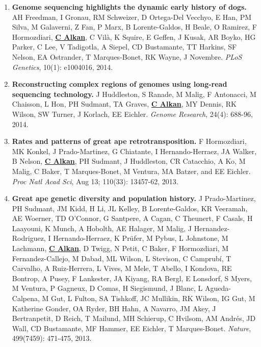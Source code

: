 \begin{enumerate}
  
  \item        
         {\bf Genome sequencing highlights the dynamic early history of dogs.} 
         AH Freedman, I Gronau, RM Schweizer, D Ortega-Del Vecchyo, E Han, PM Silva, 
         M Galaverni, Z Fan, P Marx, B Lorente-Galdos, H Beale, O Ramirez, F Hormozdiari, 
         {\bf {\underline {C Alkan}}}, 
         C Vilà, K Squire, E Geffen, J Kusak, AR Boyko, HG Parker, 
         C Lee, V Tadigotla, A Siepel, CD Bustamante, TT Harkins, SF Nelson, 
         EA Ostrander, T Marques-Bonet, RK Wayne, J Novembre. 
         {\em PLoS Genetics}, 10(1): e1004016, 2014.


 \item        
        {\bf Reconstructing complex regions of genomes using long-read sequencing technology.}
         J Huddleston, S Ranade, M Malig, F Antonacci, M Chaisson, L Hon, PH Sudmant, TA Graves, 
         {\bf {\underline{C Alkan}}}, MY Dennis, RK Wilson, SW Turner, J Korlach, EE Eichler. 
         {\em Genome Research},  24(4): 688-96, 2014.


 \item        
        {\bf Rates and patterns of great ape retrotransposition.}
        F Hormozdiari, MK Konkel, J Prado-Martinez, G Chiatante, I Hernando-Herraez, JA Walker, B Nelson, {\bf {\underline {C Alkan}}}, PH Sudmant, J Huddleston, CR Catacchio, A Ko, 
        M Malig, C Baker, T Marques-Bonet, M Ventura, MA Batzer, and EE Eichler. 
        {\em Proc Natl Acad Sci}, Aug 13; 110(33): 13457-62, 2013.
                             

 \item
        {\bf Great ape genetic diversity and population history.}
        J Prado-Martinez, PH Sudmant, JM Kidd, H Li, JL Kelley, B Lorente-Galdos, KR Veeramah, AE Woerner, TD O’Connor, G Santpere, A Cagan, C Theunert, F Casals, H Laayouni, K Munch, A Hobolth, AE Halager, M Malig, J Hernandez-Rodriguez, I Hernando-Herraez, K Prüfer, M Pybus, L Johnstone, M Lachmann, {\bf {\underline {C Alkan}}}, D Twigg, N Petit, C Baker, F Hormozdiari, M Fernandez-Callejo, M Dabad, ML Wilson, L Stevison, C Camprubí, T Carvalho, A Ruiz-Herrera, L Vives, M Mele, T Abello, I Kondova, RE Bontrop, A Pusey, F Lankester, JA Kiyang, RA Bergl, E Lonsdorf, S Myers, M Ventura, P Gagneux, D Comas, H Siegismund, J Blanc, L Agueda-Calpena, M Gut, L Fulton, SA Tishkoff, JC Mullikin, RK Wilson, IG Gut, M Katherine Gonder, OA Ryder, BH Hahn, A Navarro, JM Akey, J Bertranpetit, D Reich, T Mailund, MH Schierup, C Hvilsom, AM Andrés, JD Wall, CD Bustamante, MF Hammer, EE Eichler, T Marques-Bonet. 
        {\em Nature}, 499(7459): 471-475, 2013.


\end{enumerate}
